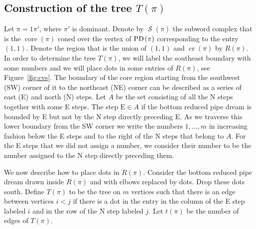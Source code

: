 \documentclass[10pt]{amsart}
\theoremstyle{definition}
\numberwithin{equation}{section}
\DeclareMathOperator{\core}{core}
\DeclareMathOperator{\rmcr}{cr}
\newcommand*\+{\smash{\lower2pt\hbox{\rlap{\vrule height14pt}}\raise2pt\hbox{\rlap{\hskip-3pt \vrule height.4pt depth0pt width14.7pt}}}}
\newcommand*{\MK}{\mkern 2mu}
\DeclareMathOperator{\PD}{\textit{PD}\MK}
\DeclareMathOperator{\Scal}{\mathcal{S}}
\begin{document}
\subsection{Construction of the tree \texorpdfstring{$T(\pi)$}{T(pi)}}

Let $\pi=1\pi'$, where $\pi'$ is dominant. Denote by $\Scal(\pi)$ the subword complex that is the $\core(\pi)$ coned over the vertex of $\PD(\pi)$ corresponding to the entry $(1,1)$. Denote the region that is the union of $(1,1)$ and $\rmcr(\pi)$ by $R(\pi)$. In order to determine the tree $T(\pi)$, we will label the southeast boundary with some numbers and we will place dots in some entries of $R(\pi)$, see Figure~\ref{fig:cvs}. The boundary of the core region starting from the southwest (SW) corner of it to the northeast (NE) corner can be described as a series of east (E) and north (N) steps. Let $A$ be the set consisting of all the N steps together with some E steps. The step $\text{E}\in A$ if the bottom reduced pipe dream is bounded by E but not by the N step directly preceding E. As we traverse this lower boundary from the SW corner we write the numbers $1,\dots, m$ in increasing fashion below the E steps and to the right of the N steps that belong to $A$. For the E steps that we did not assign a number, we consider their number to be the number assigned to the N step directly preceding them.

We now describe how to place dots in $R(\pi)$. Consider the bottom reduced pipe dream drawn inside $R(\pi)$ and with elbows replaced by dots. Drop these dots south. Define $T(\pi)$ to be the tree on $m$ vertices such that there is an edge between vertices $i<j$ if there is a dot in the entry in the column of the E step labeled $i$ and in the row of the N step labeled $j$. Let $t(\pi)$ be the number of edges of $T(\pi)$.
\end{document}
